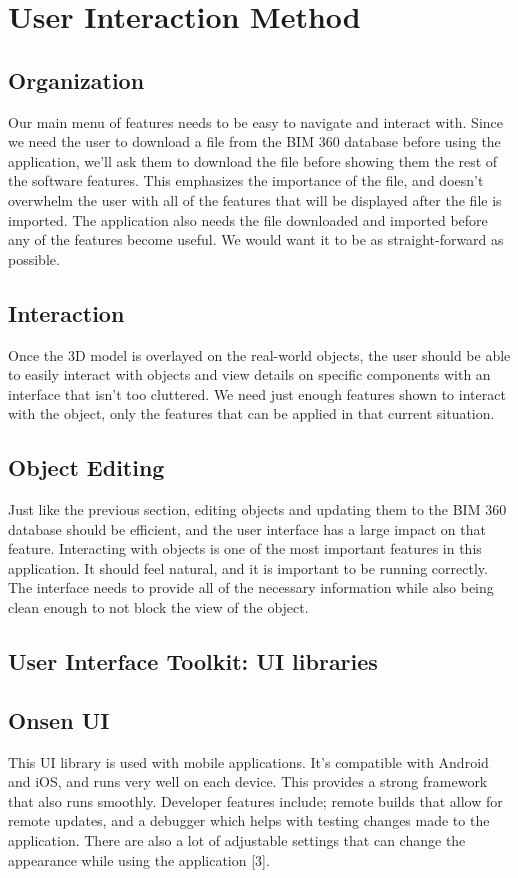 \documentclass[a4paper, 11pt]{article} %
\begin{document}
\section{User Interaction Method}
    \subsection{Organization} Our main menu of features needs to be easy to navigate and interact with. Since we need the user to download a file from the BIM 360 database before using the application, we'll ask them to download the file before showing them the rest of the software features. This emphasizes the importance of the file, and doesn't overwhelm the user with all of the features that will be displayed after the file is imported. The application also needs the file downloaded and imported before any of the features become useful. We would want it to be as straight-forward as possible.
    \subsection{Interaction} Once the 3D model is overlayed on the real-world objects, the user should be able to easily interact with objects and view details on specific components with an interface that isn't too cluttered. We need just enough features shown to interact with the object, only the features that can be applied in that current situation.
    \subsection{Object Editing} Just like the previous section, editing objects and updating them to the BIM 360 database should be efficient, and the user interface has a large impact on that feature. Interacting with objects is one of the most important features in this application. It should feel natural, and it is important to be running correctly. The interface needs to provide all of the necessary information while also being clean enough to not block the view of the object.

\subsection{User Interface Toolkit: UI libraries}
    \subsection{Onsen UI} This UI library is used with mobile applications. It's compatible with Android and iOS, and runs very well on each device. This provides a strong framework that also runs smoothly. Developer features include; remote builds that allow for remote updates, and a debugger which helps with testing changes made to the application. There are also a lot of adjustable settings that can change the appearance while using the application [3].
\end{document}
